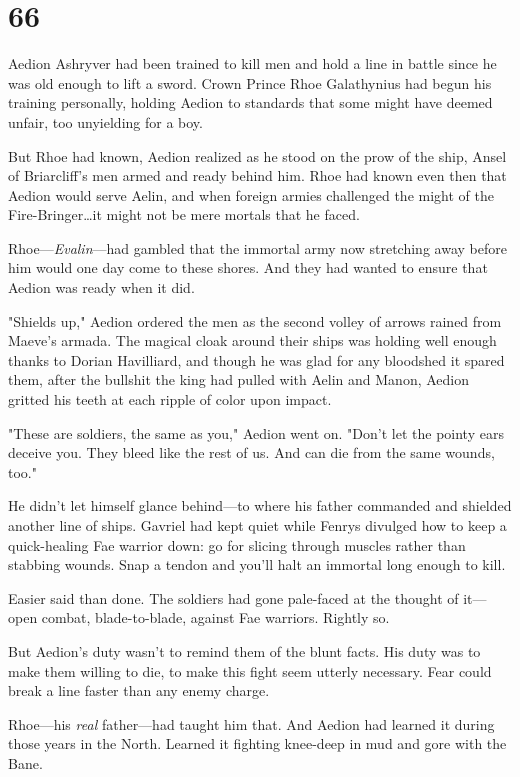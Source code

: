 
\chapter{66}

Aedion Ashryver had been trained to kill men and hold a line in battle since he was old enough to lift a sword.
Crown Prince Rhoe Galathynius had begun his training personally, holding Aedion to standards that some might have deemed unfair, too unyielding for a boy.

But Rhoe had known, Aedion realized as he stood on the prow of the ship, Ansel of Briarcliff's men armed and ready behind him.
Rhoe had known even then that Aedion would serve Aelin, and when foreign armies challenged the might of the Fire-Bringer\ldots it might not be mere mortals that he faced.

Rhoe---\emph{Evalin}---had gambled that the immortal army now stretching away before him would one day come to these shores.
And they had wanted to ensure that Aedion was ready when it did.

"Shields up," Aedion ordered the men as the second volley of arrows rained from Maeve's armada.
The magical cloak around their ships was holding well enough thanks to Dorian Havilliard, and though he was glad for any bloodshed it spared them, after the bullshit the king had pulled with Aelin and Manon, Aedion gritted his teeth at each ripple of color upon impact.

"These are soldiers, the same as you," Aedion went on.
"Don't let the pointy ears deceive you.
They bleed like the rest of us.
And can die from the same wounds, too."

He didn't let himself glance behind---to where his father commanded and shielded another line of ships.
Gavriel had kept quiet while Fenrys divulged how to keep a quick-healing Fae warrior down: go for slicing through muscles rather than stabbing wounds.
Snap a tendon and you'll halt an immortal long enough to kill.

Easier said than done.
The soldiers had gone pale-faced at the thought of it--- open combat, blade-to-blade, against Fae warriors.
Rightly so.

But Aedion's duty wasn't to remind them of the blunt facts.
His duty was to make them willing to die, to make this fight seem utterly necessary.
Fear could break a line faster than any enemy charge.

Rhoe---his \emph{real} father---had taught him that.
And Aedion had learned it during those years in the North.
Learned it fighting knee-deep in mud and gore with the Bane.

